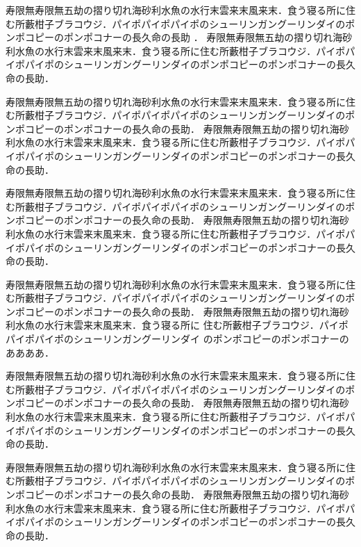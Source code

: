 \documentclass[a4j,papersize]{jsbook}
\begin{document}
寿限無寿限無五劫の摺り切れ海砂利水魚の水行末雲来末風来末．食う寝る所に住む所藪柑子ブラコウジ．パイポパイポパイポのシューリンガングーリンダイのポンポコピーのポンポコナーの長久命の長助
．
寿限無寿限無五劫の摺り切れ海砂利水魚の水行末雲来末風来末．食う寝る所に住む所藪柑子ブラコウジ．パイポパイポパイポのシューリンガングーリンダイのポンポコピーのポンポコナーの長久命の長助．

寿限無寿限無五劫の摺り切れ海砂利水魚の水行末雲来末風来末．食う寝る所に住む所藪柑子ブラコウジ．パイポパイポパイポのシューリンガングーリンダイのポンポコピーのポンポコナーの長久命の長助．
寿限無寿限無五劫の摺り切れ海砂利水魚の水行末雲来末風来末．食う寝る所に住む所藪柑子ブラコウジ．パイポパイポパイポのシューリンガングーリンダイのポンポコピーのポンポコナーの長久命の長助．

寿限無寿限無五劫の摺り切れ海砂利水魚の水行末雲来末風来末．食う寝る所に住む所藪柑子ブラコウジ．パイポパイポパイポのシューリンガングーリンダイのポンポコピーのポンポコナーの長久命の長助．
寿限無寿限無五劫の摺り切れ海砂利水魚の水行末雲来末風来末．食う寝る所に住む所藪柑子ブラコウジ．パイポパイポパイポのシューリンガングーリンダイのポンポコピーのポンポコナーの長久命の長助．

寿限無寿限無五劫の摺り切れ海砂利水魚の水行末雲来末風来末．食う寝る所に住む所藪柑子ブラコウジ．パイポパイポパイポのシューリンガングーリンダイのポンポコピーのポンポコナーの長久命の長助．
寿限無寿限無五劫の摺り切れ海砂利水魚の水行末雲来末風来末．食う寝る所に
住む所藪柑子ブラコウジ．パイポパイポパイポのシューリンガングーリンダイ
のポンポコピーのポンポコナーのああああ．

寿限無寿限無五劫の摺り切れ海砂利水魚の水行末雲来末風来末．食う寝る所に住む所藪柑子ブラコウジ．パイポパイポパイポのシューリンガングーリンダイのポンポコピーのポンポコナーの長久命の長助．
寿限無寿限無五劫の摺り切れ海砂利水魚の水行末雲来末風来末．食う寝る所に住む所藪柑子ブラコウジ．パイポパイポパイポのシューリンガングーリンダイのポンポコピーのポンポコナーの長久命の長助．

寿限無寿限無五劫の摺り切れ海砂利水魚の水行末雲来末風来末．食う寝る所に住む所藪柑子ブラコウジ．パイポパイポパイポのシューリンガングーリンダイのポンポコピーのポンポコナーの長久命の長助．
寿限無寿限無五劫の摺り切れ海砂利水魚の水行末雲来末風来末．食う寝る所に住む所藪柑子ブラコウジ．パイポパイポパイポのシューリンガングーリンダイのポンポコピーのポンポコナーの長久命の長助．
\end{document}
